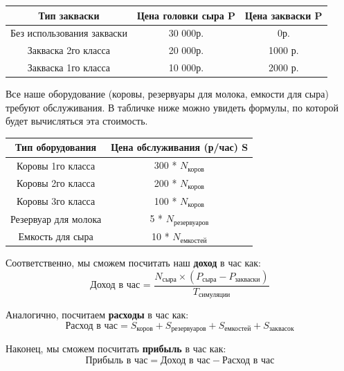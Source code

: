\documentclass[a4paper, 14pt]{article}
\begin{document}
\begin{center}
	\begin{tabular}{|c|c|c|}
		\hline
		\textbf{Тип закваски}      & \textbf{Цена головки сыра P} & \textbf{Цена закваски P} \\
		\hline
		Без использования закваски & 30 000р.                     & 0р.                      \\
		\hline
		Закваска 2го класса        & 20 000р.                     & 1000 р.                  \\
		\hline
		Закваска 1го класса        & 10 000р.                     & 2000 р.                  \\
		\hline
	\end{tabular}
\end{center}

Все наше оборудование (коровы, резервуары для молока, емкости для сыра) требуют обслуживания. В табличке ниже можно увидеть формулы, по которой будет вычисляться эта стоимость.

\begin{center}
	\begin{tabular}{|c|c|}
		\hline
		\textbf{Тип оборудования} & \textbf{Цена обслуживания (р/час) S} \\
		\hline
		Коровы 1го класса         & 300 * $N_\text{коров}$               \\
		\hline
		Коровы 2го класса         & 200 * $N_\text{коров}$               \\
		\hline
		Коровы 3го класса         & 100 * $N_\text{коров}$               \\
		\hline
		Резервуар для молока      & 5 * $N_\text{резервуаров}$           \\
		\hline
		Емкость для сыра          & 10 * $N_\text{емкостей}$             \\
		\hline
	\end{tabular}
\end{center}

Соответственно, мы сможем посчитать наш \textbf{доход} в час как:
$$\text{Доход в час = } \frac{N_\text{сыра} \times (P_\text{сыра} - P_\text{закваски})}{T_\text{симуляции}}$$

Аналогично, посчитаем \textbf{расходы} в час как:
$$\text{Расход в час} = S_\text{коров} + S_\text{резервуаров} + S_\text{емкостей} + S_\text{заквасок}$$

Наконец, мы сможем посчитать \textbf{прибыль} в час как:
$$\text{Прибыль в час} = \text{Доход в час} - \text{Расход в час}$$
\end{document}
